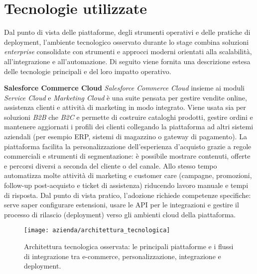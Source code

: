 \section{Tecnologie utilizzate}

Dal punto di vista delle piattaforme, degli strumenti operativi e delle pratiche di deployment, l’ambiente tecnologico osservato durante lo stage combina soluzioni \emph{enterprise} 
consolidate con strumenti e approcci moderni orientati alla scalabilità, all’integrazione e all’automazione. 
Di seguito viene fornita una descrizione estesa delle tecnologie principali e del loro impatto operativo.

\medskip
\noindent\textbf{Salesforce Commerce Cloud}
\emph{Salesforce Commerce Cloud} insieme ai moduli \emph{Service Cloud} e \emph{Marketing Cloud} è una suite pensata per gestire vendite online, assistenza clienti e 
attività di marketing in modo integrato. Viene usata sia per soluzioni \emph{B2B} che \emph{B2C} e permette di costruire cataloghi prodotti, gestire ordini e mantenere 
aggiornati i profili dei clienti collegando la piattaforma ad altri sistemi aziendali (per esempio ERP, sistemi di magazzino o gateway di pagamento).
La piattaforma facilita la personalizzazione dell’esperienza d’acquisto grazie a regole commerciali e strumenti di segmentazione: è possibile mostrare contenuti, 
offerte e percorsi diversi a seconda del cliente o del canale. Allo stesso tempo automatizza molte attività di marketing e customer care (campagne, promozioni, 
follow-up post-acquisto e ticket di assistenza) riducendo lavoro manuale e tempi di risposta.
Dal punto di vista pratico, l’adozione richiede competenze specifiche: serve saper configurare estensioni, usare le API per le integrazioni e gestire il processo di 
rilascio (deployment) verso gli ambienti cloud della piattaforma.

\begin{figure}[htbp]
    \centering
    \texttt{[image: azienda/architettura\_tecnologica]}
    \caption{Architettura tecnologica osservata: le principali piattaforme e i flussi di integrazione tra e-commerce, personalizzazione, integrazione e deployment.}
    \label{fig:architettura_tecnologica}
\end{figure}


